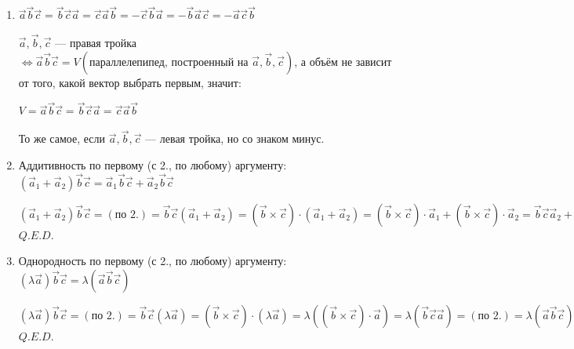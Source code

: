 \documentclass[twoside]{book}
\DeclareMathOperator{\proj}{proj}
\begin{document}
\begin{enumerate}
          \(V := V(\text{параллелепипед, построенный на } \vec a, \vec b, \vec c) = \\
          = S(\text{параллелограмм, построенный на } \vec a, \vec b) \cdot h\), где \(h\) - высота параллелограмма.

          \(h = |\proj_{\vec a \times \vec b}\vec c| = ||\vec c| \cos \varphi|\)

          \(S(\text{параллелограмм, построенный на } \vec a, \vec b) = |\vec a \times \vec b|\)

          \(V = |\vec a \times \vec b| \cdot ||\vec c| \cos \varphi| = |(\vec a \times \vec b) \cdot \vec c| = |\vec a \vec b \vec c|\) \(Q.E.D.\)
    \item \(\vec a \vec b \vec c = \vec b \vec c \vec a = \vec c \vec a \vec b = -\vec c \vec b \vec a = -\vec b \vec a \vec c = -\vec a \vec c \vec b\)

          \(\vec a, \vec b, \vec c\) --- правая тройка \(\Leftrightarrow \vec a \vec b \vec c = V(\text{параллелепипед, построенный на } \vec a, \vec b, \vec c)\),
          а объём не зависит от того, какой вектор выбрать первым, значит:

          \(V = \vec a \vec b \vec c = \vec b \vec c \vec a = \vec c \vec a \vec b\)

          То же самое, если \(\vec a, \vec b, \vec c\) --- левая тройка, но со знаком минус.

    \item Аддитивность по первому (с 2., по любому) аргументу:
          \((\vec a_1 + \vec a_2)\vec b \vec c = \vec a_1 \vec b \vec c + \vec a_2 \vec b \vec c\)

          \((\vec a_1 + \vec a_2)\vec b \vec c = (\text{по 2.}) = \vec b \vec c (\vec a_1 + \vec a_2) =
          (\vec b \times \vec c) \cdot (\vec a_1 + \vec a_2) =
          (\vec b \times \vec c) \cdot \vec a_1 + (\vec b \times \vec c) \cdot \vec a_2 =
          \vec b \vec c \vec a_2 + \vec b \vec c \vec a_1 = (\text{по 2.}) =
          \vec a_1 \vec b \vec c + \vec a_2 \vec b \vec c\) \(Q.E.D.\)
    \item Однородность по первому (с 2., по любому) аргументу:
          \((\lambda\vec a)\vec b \vec c = \lambda(\vec a \vec b \vec c)\)

          \((\lambda\vec a)\vec b \vec c = (\text{по 2.}) = \vec b \vec c (\lambda\vec a) =
          (\vec b \times \vec c) \cdot (\lambda\vec a) =
          \lambda((\vec b \times \vec c) \cdot \vec a) =
          \lambda(\vec b \vec c \vec a) = (\text{по 2.}) =
          \lambda(\vec a \vec b \vec c)\) \(Q.E.D.\)
\end{enumerate}
\end{document}
